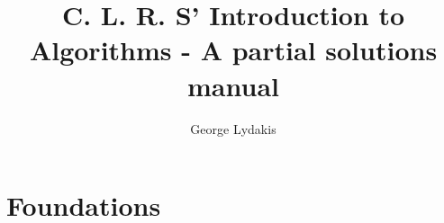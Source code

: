 \documentclass[a4paper, 11pt]{book}
\begin{document}
\title{C. L. R. S' Introduction to Algorithms - A partial solutions manual}
\author{George Lydakis}
\maketitle

\setcounter{tocdepth}{2}
\tableofcontents

%
%
\part{Foundations}
\setcounter{chapter}{1} 

\end{document}
